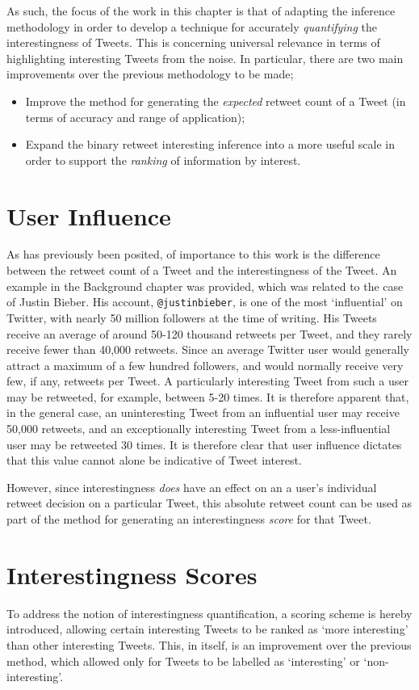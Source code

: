 As such, the focus of the work in this chapter is that of adapting the inference methodology in order to develop a technique for accurately \textit{quantifying} the interestingness of Tweets. This is concerning universal relevance in terms of highlighting interesting Tweets from the noise. In particular, there are two main improvements over the previous methodology to be made;
\begin{itemize}
    \item Improve the method for generating the \textit{expected} retweet count of a Tweet (in terms of accuracy and range of application);
    \item Expand the binary retweet interesting inference into a more useful scale in order to support the \textit{ranking} of information by interest.
\end{itemize}


\section{User Influence}
As has previously been posited, of importance to this work is the difference between the retweet count of a Tweet and the interestingness of the Tweet. An example in the Background chapter was provided, which was related to the case of Justin Bieber. His account, \texttt{@justinbieber}, is one of the most `influential' on Twitter, with nearly 50 million followers at the time of writing. His Tweets receive an average of around 50-120 thousand retweets per Tweet, and they rarely receive fewer than 40,000 retweets. Since an average Twitter user would generally attract a maximum of a few hundred followers, and would normally receive very few, if any, retweets per Tweet. A particularly interesting Tweet from such a user may be retweeted, for example, between 5-20 times. It is therefore apparent that, in the general case, an uninteresting Tweet from an influential user may receive 50,000 retweets, and an exceptionally interesting Tweet from a less-influential user may be retweeted 30 times. It is therefore clear that user influence dictates that this value cannot alone be indicative of Tweet interest.

However, since interestingness \textit{does} have an effect on an a user's individual retweet decision on a particular Tweet, this absolute retweet count can be used as part of the method for generating an interestingness \textit{score} for that Tweet.


\section{Interestingness Scores}
To address the notion of interestingness quantification, a scoring scheme is hereby introduced, allowing certain interesting Tweets to be ranked as `more interesting' than other interesting Tweets. This, in itself, is an improvement over the previous method, which allowed only for Tweets to be labelled as `interesting' or `non-interesting'.

